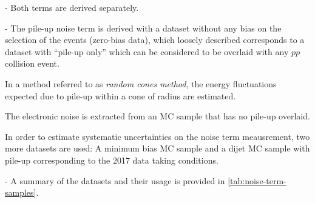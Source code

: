 - Both terms are derived separately.

- The pile-up noise term is derived with a dataset without any bias on the selection of the events (zero-bias data), which loosely described corresponds to a dataset with ``pile-up only'' which can be considered to be overlaid with any $pp$ collision event. 

In a method referred to as \emph{random cones method}, the energy fluctuations expected due to pile-up within a cone of radius \Rrandomcone are estimated.

The electronic noise is extracted from an MC sample that has no pile-up overlaid.

In order to estimate systematic uncertainties on the noise term meausrement, two more datasets are used: A minimum bias MC sample and a dijet MC sample with pile-up corresponding to the 2017 data taking conditions.

- A summary of the datasets and their usage is provided in \cref{tab:noise-term-samples}.




